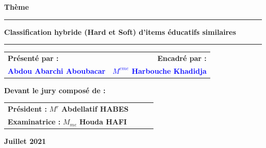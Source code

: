 {\begin{titlepage}
\begin{center}
\vspace{1cm}
\Huge\textbf{Thème}
\noindent\rule{\textwidth}{0.9mm}
\Large{\textbf{Classification hybride (Hard et Soft) d'items éducatifs similaires}}
\noindent\rule{\textwidth}{0.9mm}
\end{center}
\vspace{1.5cm}
\begin{tabular}{l r}
\hspace{1cm}\textbf{Présenté par :}&\hspace{5cm}\textbf{Encadré par :}\\
\hspace{1cm}\textbf{\textcolor{blue}{Abdou Abarchi Aboubacar}}&\textbf{\textcolor{blue}{$M^{eme}$ Harbouche Khadidja}}\\
\end{tabular}
\begin{center}
\vspace{1.5cm}
\hspace{0.3cm}\textbf{\large{Devant le jury composé de : }}\\
\vspace{0.5cm}
\begin{tabular}{llll}
\hspace{0.3cm}\textbf{\textbf{ Président : }} \hspace{0.8cm} $M^{r}$ \textbf{Abdellatif  HABES} \\
\vspace{0.1cm}
\hspace{0.3cm}\textbf{\textbf{Examinatrice : }} \hspace{0.2cm} $M_{me}$ \textbf{Houda  HAFI}
\end{tabular}
\end{center}
\vspace{2cm}
\begin{center}
\textbf{Juillet 2021}
\end{center}

\end{titlepage}
\restoregeometry  
\nopagebreak
}
\newcommand{\firstpart}{\part{\'Etat de l'art}}
